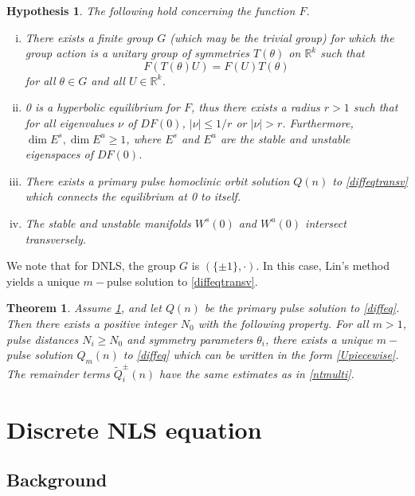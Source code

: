 \documentclass[12pt]{elsarticle}
\def\R{{\mathbb R}}
\newtheorem{theorem}{Theorem}
\newtheorem{hypothesis}{Hypothesis}
\begin{document}
\begin{hypothesis}\label{transversehyp}
The following hold concerning the function $F$.
\begin{enumerate}[(i)]
\item There exists a finite group $G$ (which may be the trivial group) for which the group action is a unitary group of symmetries $T(\theta)$ on $\R^k$ such that 
\begin{equation}\label{symmetrytransverse}
F(T(\theta)U) = F(U)T(\theta)
\end{equation}
for all $\theta \in G$ and all $U \in \R^k$. 
\item 0 is a hyperbolic equilibrium for $F$, thus there exists a radius $r > 1$ such that for all eigenvalues $\nu$ of $DF(0)$, $|\nu| \leq 1/r$ or $|\nu| > r$. Furthermore, $\dim E^s, \dim E^u \geq 1$, where $E^s$ and $E^u$ are the stable and unstable eigenspaces of $DF(0)$.
\item There exists a primary pulse homoclinic orbit solution $Q(n)$ to \cref{diffeqtransv} which connects the equilibrium at 0 to itself.
\item The stable and unstable manifolds $W^s(0)$ and $W^u(0)$ intersect transversely.
\end{enumerate}
\end{hypothesis}
We note that for DNLS, the group $G$ is $( \{\pm 1\}, \cdot)$. In this case, Lin's method yields a unique $m-$pulse solution to \cref{diffeqtransv}.

\begin{theorem}\label{transversemulti}
Assume \cref{transversehyp}, and let $Q(n)$ be the primary pulse solution to \cref{diffeq}. Then there exists a positive integer $N_0$ with the following property. For all $m > 1$, pulse distances $N_i \geq N_0$ and symmetry parameters $\theta_i$, there exists a unique $m-$pulse solution $Q_m(n)$ to \cref{diffeq} which can be written in the form \cref{Upiecewise}. The remainder terms $\tilde{Q}_i^\pm(n)$ have the same estimates as in \cref{ntmulti}.
\end{theorem}

\section{Discrete NLS equation}\label{sec:DNLS}

\subsection{Background}
\end{document}
